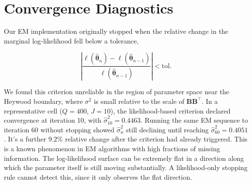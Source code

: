 \section{Convergence Diagnostics}
\label{sec:sim-convergence}

Our EM implementation originally stopped when the relative change in the marginal log-likelihood fell below a tolerance,

\begin{equation}
    \left| \frac{\ell(\hat{\bm{\theta}}_{n}) - \ell(\hat{\bm{\theta}}_{n-1})}{\ell(\hat{\bm{\theta}}_{n-1})} \right| < \mathrm{tol}.
\end{equation}

We found this criterion unreliable in the region of parameter space near the Heywood boundary, where $\sigma^2$ is small relative to the scale of $\mathbf{BB}^\top$. In a representative cell ($Q=400$, $J=10$), the likelihood-based criterion declared convergence at iteration 10, with $\hat\sigma_{10}^2 = 0.4463$. Running the same EM sequence to iteration 60 without stopping showed $\hat\sigma_{n}^2$ still declining until reaching $\hat\sigma_{60}^2=0.4051$. It's a further $9.2\%$ relative change after the criterion had already triggered. This is a known phenomenon in EM algorithms with high fractions of missing information. The log-likelihood surface can be extremely flat in a direction along which the parameter itself is still moving substantially. A likelihood-only stopping rule cannot detect this, since it only observes the flat direction.

